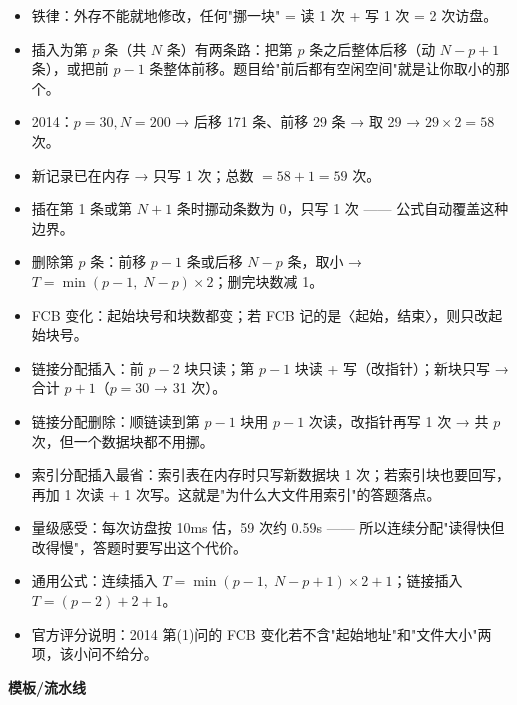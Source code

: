 \documentclass[10pt,a4paper]{ctexart}
\begin{document}
\begin{itemize}

\item 铁律：外存不能就地修改，任何"挪一块" = 读 1 次 + 写 1 次 = 2 次访盘。

\item 插入为第 $p$ 条（共 $N$ 条）有两条路：把第 $p$ 条之后整体后移（动 $N-p+1$ 条），或把前 $p-1$ 条整体前移。题目给"前后都有空闲空间"就是让你取小的那个。

\item 2014：$p=30,N=200$ → 后移 171 条、前移 29 条 → 取 29 → $29\times2=58$ 次。

\item 新记录已在内存 → 只写 1 次；总数 $=58+1=59$ 次。

\item 插在第 1 条或第 $N+1$ 条时挪动条数为 0，只写 1 次 —— 公式自动覆盖这种边界。

\item 删除第 $p$ 条：前移 $p-1$ 条或后移 $N-p$ 条，取小 → $T=\min(p-1,\;N-p)\times2$；删完块数减 1。

\item FCB 变化：起始块号和块数都变；若 FCB 记的是〈起始，结束〉，则只改起始块号。

\item 链接分配插入：前 $p-2$ 块只读；第 $p-1$ 块读 + 写（改指针）；新块只写 → 合计 $p+1$（$p=30$ → 31 次）。

\item 链接分配删除：顺链读到第 $p-1$ 块用 $p-1$ 次读，改指针再写 1 次 → 共 $p$ 次，但一个数据块都不用挪。

\item 索引分配插入最省：索引表在内存时只写新数据块 1 次；若索引块也要回写，再加 1 次读 + 1 次写。这就是"为什么大文件用索引"的答题落点。

\item 量级感受：每次访盘按 10ms 估，59 次约 0.59s —— 所以连续分配"读得快但改得慢"，答题时要写出这个代价。

\item 通用公式：连续插入 $T=\min(p-1,\;N-p+1)\times2+1$；链接插入 $T=(p-2)+2+1$。

\item 官方评分说明：2014 第(1)问的 FCB 变化若不含"起始地址"和"文件大小"两项，该小问不给分。

\end{itemize}

\textbf{模板/流水线}
\end{document}
